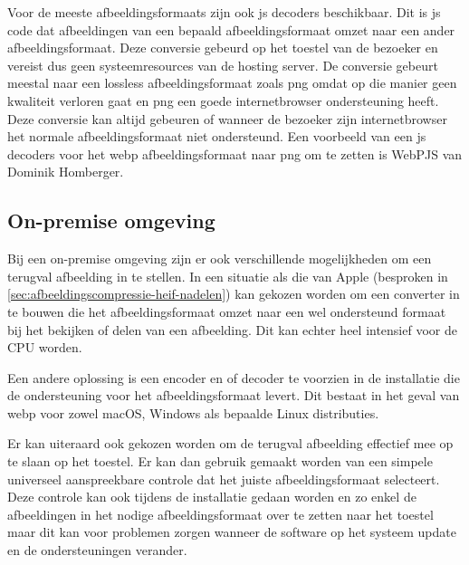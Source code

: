 Voor de meeste \glspl{afbeeldingsformaat} zijn ook \gls{js} \glspl{decoder} beschikbaar. Dit is \gls{js} code dat afbeeldingen van een bepaald \gls{afbeeldingsformaat} omzet naar een ander \gls{afbeeldingsformaat}. Deze conversie gebeurd op het toestel van de bezoeker en vereist dus geen systeemresources van de \gls{hosting} server. De conversie gebeurt meestal naar een \gls{lossless} \gls{afbeeldingsformaat} zoals \gls{png} omdat op die manier geen kwaliteit verloren gaat en \gls{png} een goede internetbrowser ondersteuning heeft. Deze conversie kan altijd gebeuren of wanneer de bezoeker zijn internetbrowser het normale \gls{afbeeldingsformaat} niet ondersteund. Een voorbeeld van een \gls{js} \glspl{decoder} voor het \gls{webp} \gls{afbeeldingsformaat} naar \gls{png} om te zetten is WebPJS van Dominik Homberger.

\subsection{On-premise omgeving}
\label{sec:afbeeldingscompressie-implementatie-on-premise}

Bij een \gls{on-premise} omgeving zijn er ook verschillende mogelijkheden om een terugval afbeelding in te stellen. In een situatie als die van Apple (besproken in \ref{sec:afbeeldingscompressie-heif-nadelen}) kan gekozen worden om een converter in te bouwen die het \gls{afbeeldingsformaat} omzet naar een wel ondersteund formaat bij het bekijken of delen van een afbeelding. Dit kan echter heel intensief voor de CPU worden.

Een andere oplossing is een encoder en of decoder te voorzien in de installatie die de ondersteuning voor het \gls{afbeeldingsformaat} levert. Dit bestaat in het geval van \gls{webp} voor zowel macOS, Windows als bepaalde Linux distributies.

Er kan uiteraard ook gekozen worden om de terugval afbeelding effectief mee op te slaan op het toestel. Er kan dan gebruik gemaakt worden van een simpele universeel aanspreekbare controle dat het juiste afbeeldingsformaat selecteert. Deze controle kan ook tijdens de installatie gedaan worden en zo enkel de afbeeldingen in het nodige \gls{afbeeldingsformaat} over te zetten naar het toestel maar dit kan voor problemen zorgen wanneer de software op het systeem update en de ondersteuningen verander.